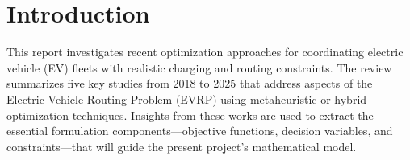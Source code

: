 \section{Introduction}\label{sec1}
This report investigates recent optimization approaches for coordinating electric vehicle (EV) fleets with realistic charging and routing constraints. The review summarizes five key studies from 2018 to 2025 that address aspects of the Electric Vehicle Routing Problem (EVRP) using metaheuristic or hybrid optimization techniques. Insights from these works are used to extract the essential formulation components---objective functions, decision variables, and constraints---that will guide the present project's mathematical model.
